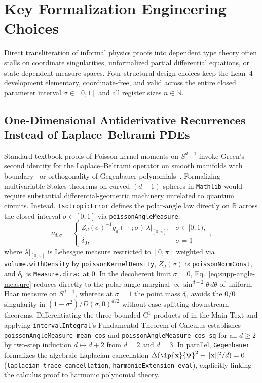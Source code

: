 \section{Key Formalization Engineering Choices}
\label{sec:supp-engineering}

Direct transliteration of informal physics proofs into dependent type theory often stalls on coordinate singularities, unformalized partial differential equations, or state-dependent measure spaces. Four structural design choices keep the Lean~4 development elementary, coordinate-free, and valid across the entire closed parameter interval $\sigma \in [0, 1]$ and all register sizes $n \in \mathbb{N}$.

\subsection{One-Dimensional Antiderivative Recurrences Instead of Laplace--Beltrami PDEs}
\label{sec:supp-ftc}

Standard textbook proofs of Poisson-kernel moments on $S^{d-1}$ invoke Green's second identity for the Laplace--Beltrami operator on smooth manifolds with boundary~\cite{Axler2001} or orthogonality of Gegenbauer polynomials~\cite{LacallePozoCoronado2019}. Formalizing multivariable Stokes theorems on curved $(d - 1)$-spheres in \texttt{Mathlib} would require substantial differential-geometric machinery unrelated to quantum circuits. Instead, \texttt{IsotropicError} defines the polar-angle law directly on $\mathbb{R}$ across the closed interval $\sigma \in [0, 1]$ via \texttt{poissonAngleMeasure}:
\begin{equation}
\nu_{d,\sigma} =
\begin{cases}
Z_d(\sigma)^{-1} g_d(\,\cdot\,; \sigma)\,\lambda\rvert_{[0,\pi]}, & \sigma \in [0, 1), \\[3pt]
\delta_0, & \sigma = 1
\end{cases},
\label{eq:supp-angle-measure}
\end{equation}
where $\lambda\rvert_{[0,\pi]}$ is Lebesgue measure restricted to $[0, \pi]$ weighted via \texttt{volume.withDensity} by \texttt{poissonKernelDensity}, $Z_d(\sigma)$ is \texttt{poissonNormConst}, and $\delta_0$ is \texttt{Measure.dirac} at $0$. In the decoherent limit $\sigma = 0$, Eq.~\eqref{eq:supp-angle-measure} reduces directly to the polar-angle marginal $\propto \sin^{d-2}\theta\,d\theta$ of uniform Haar measure on $S^{d-1}$, whereas at $\sigma = 1$ the point mass $\delta_0$ avoids the $0/0$ singularity in $(1 - \sigma^2)/D(\sigma, 0)^{d/2}$ without case-splitting downstream theorems. Differentiating the three bounded $\mathrm{C}^1$ products of  in the Main Text and applying \texttt{intervalIntegral}'s Fundamental Theorem of Calculus establishes \texttt{poissonAngleMeasure\_mean\_cos} and \texttt{poissonAngleMeasure\_cos\_sq} for all $d \ge 2$ by two-step induction $d \mapsto d + 2$ from $d = 2$ and $d = 3$. In parallel, \texttt{Gegenbauer} formalizes the algebraic Laplacian cancellation $\Delta(\ip{\mathbf{x}}{\Psi}^2 - \norm{\mathbf{x}}^2/d) = 0$ (\texttt{laplacian\_trace\_cancellation}, \texttt{harmonicExtension\_eval}), explicitly linking the calculus proof to harmonic polynomial theory.

